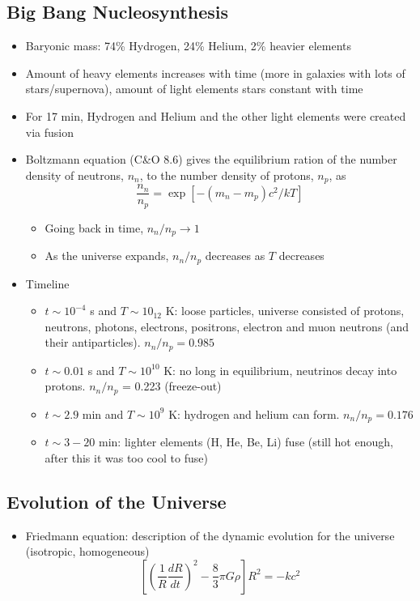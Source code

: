 \documentclass{book}
\begin{document}
\subsection{Big Bang Nucleosynthesis}
\begin{itemize}
    \item Baryonic mass: 74\% Hydrogen, 24\% Helium, 2\% heavier elements
    \item Amount of heavy elements increases with time (more in galaxies with lots of stars/supernova), amount of light elements stars constant with time
    \item For 17 min, Hydrogen and Helium and the other light elements were created via fusion
    \item Boltzmann equation (C\&O 8.6) gives the equilibrium ration of the number density of neutrons, $n_n$, to the number density of protons, $n_p$, as
          \begin{equation*}
              \frac{n_n}{n_p} = \exp\left[ - (m_n - m_p) c^2 / k T \right]
          \end{equation*}
          \begin{itemize}
              \item Going back in time, $n_n / n_p \to 1$
              \item As the universe expands, $n_n / n_p$ decreases as $T$ decreases
          \end{itemize}
    \item Timeline
          \begin{itemize}
              \item $t \sim 10^{-4}$ s and $T \sim 10_{12}$ K: loose particles, universe consisted of protons, neutrons, photons, electrons, positrons, electron and muon neutrons (and their antiparticles). $n_n / n_p = 0.985$
              \item $t \sim 0.01$ s and $T \sim 10^{10}$ K: no long in equilibrium, neutrinos decay into protons. $n_n / n_p$ = 0.223 (freeze-out)
              \item $t \sim 2.9$ min and $T \sim 10^9$ K: hydrogen and helium can form. $n_n / n_p = 0.176$
              \item $t \sim 3 - 20$ min: lighter elements (H, He, Be, Li) fuse (still hot enough, after this it was too cool to fuse)
          \end{itemize}
\end{itemize}
\subsection{Evolution of the Universe}
\begin{itemize}
    \item Friedmann equation: description of the dynamic evolution for the universe (isotropic, homogeneous)
    \begin{equation*}
        \left[  \left( \frac{1}{R} \frac{dR}{dt} \right)^2 - \frac{8}{3} \pi G \rho \right] R^2 = - k c^2 \tag{C\&O 29.107}
    \end{equation*}
\end{itemize}
\end{document}
